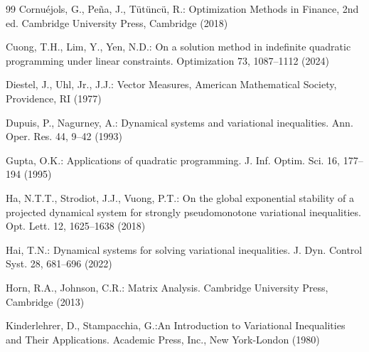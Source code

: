 \documentclass[11pt]{article}
\theoremstyle{definition}
\theoremstyle{remark}
\begin{document}
\begin{thebibliography}{99}
	  Cornu\'ejols, G., Pe\~na, J., T\"ut\"unc\"u, R.: Optimization Methods in Finance, 2nd ed. Cambridge University Press, Cambridge (2018)
	
	  Cuong, T.H., Lim, Y., Yen, N.D.: On a solution method in indefinite quadratic programming under linear constraints. Optimization 73, 1087--1112 (2024)
	
	 Diestel, J.,  Uhl, Jr.,  J.J.: Vector Measures, American Mathematical Society, Providence, RI (1977)
	
	 Dupuis, P., Nagurney, A.: Dynamical systems and variational inequalities. Ann. Oper. Res. 44, 9--42 (1993)
	
	
	
	 Gupta, O.K.: Applications of quadratic programming. J. Inf. Optim. Sci. 16, 177--194 (1995)
	
	  Ha, N.T.T., Strodiot, J.J., Vuong, P.T.: On the global exponential stability of a projected dynamical system for strongly pseudomonotone variational inequalities. Opt. Lett. 12, 1625--1638 (2018)
	
	 	Hai, T.N.: Dynamical systems for solving variational inequalities. J. Dyn. Control Syst. 28, 681--696 (2022)
	
	Horn, R.A., Johnson, C.R.: Matrix Analysis.	Cambridge University Press, Cambridge (2013)
	
%
%	
%	
	
	
	  Kinderlehrer, D., Stampacchia, G.:An Introduction to Variational Inequalities and Their Applications. Academic Press, Inc., New York-London (1980)
	

\end{thebibliography}
\end{document}
